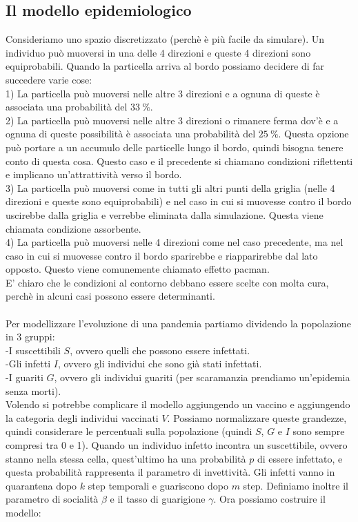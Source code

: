 \documentclass[12pt]{article}
\begin{document}
\subsection{Il modello epidemiologico}
Consideriamo uno spazio discretizzato (perchè è più facile da simulare). Un individuo può muoversi in una delle 4 direzioni e queste 4 direzioni sono equiprobabili. Quando la particella arriva al bordo possiamo decidere di far succedere varie cose: \\
1) La particella può muoversi nelle altre 3 direzioni e a ognuna di queste è associata una probabilità del $33 \ \%$. \\ 
2) La particella può muoversi nelle altre 3 direzioni o rimanere ferma dov'è e a ognuna di queste possibilità è associata una probabilità del $25 \ \%$. Questa opzione può portare a un accumulo delle particelle lungo il bordo, quindi bisogna tenere conto di questa cosa. Questo caso e il precedente si chiamano condizioni riflettenti e implicano un'attrattività verso il bordo. \\
3) La particella può muoversi come in tutti gli altri punti della griglia (nelle 4 direzioni e queste sono equiprobabili) e nel caso in cui si muovesse contro il bordo uscirebbe dalla griglia e verrebbe eliminata dalla simulazione. Questa viene chiamata condizione assorbente. \\
4) La particella può muoversi nelle 4 direzioni come nel caso precedente, ma nel caso in cui si muovesse contro il bordo sparirebbe e riapparirebbe dal lato opposto. Questo viene comunemente chiamato effetto pacman.\\
E' chiaro che le condizioni al contorno debbano essere scelte con molta cura, perchè in alcuni casi possono essere determinanti. \\  \\
Per modellizzare l'evoluzione di una pandemia partiamo dividendo la popolazione in 3 gruppi: \\ 
-I suscettibili $S$, ovvero quelli che possono essere infettati. \\ 
-Gli infetti $I$, ovvero gli individui che sono già stati infettati. \\
-I guariti $G$, ovvero gli individui guariti (per scaramanzia prendiamo un'epidemia senza morti). \\ 
Volendo si potrebbe complicare il modello aggiungendo un vaccino e aggiungendo la categoria degli individui vaccinati $V$. 
Possiamo normalizzare queste grandezze, quindi considerare le percentuali sulla popolazione (quindi $S$, $G$ e $I$ sono sempre compresi tra 0 e 1). Quando un individuo infetto incontra un suscettibile, ovvero stanno nella stessa cella, quest'ultimo ha una probabilità $p$ di essere infettato, e questa probabilità rappresenta il parametro di invettività. Gli infetti vanno in quarantena dopo $k$ step temporali e guariscono dopo $m$ step. Definiamo inoltre il parametro di socialità $\beta$ e il tasso di guarigione $\gamma$. Ora possiamo costruire il modello: 
\end{document}
